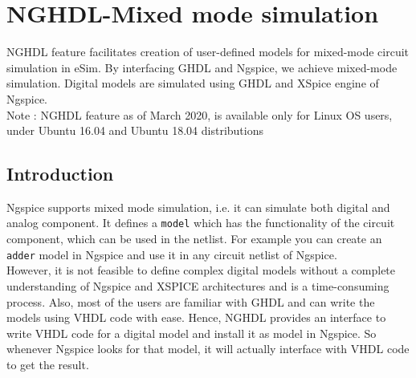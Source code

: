 \chapter{NGHDL-Mixed mode simulation}
\label{chap9}
\thispagestyle{empty}


NGHDL feature facilitates creation of user-defined models for mixed-mode circuit simulation in eSim. By interfacing GHDL and Ngspice, we achieve mixed-mode simulation. Digital models are simulated using GHDL and XSpice engine of Ngspice. \\

Note : NGHDL feature as of March 2020, is available only for Linux OS users, under Ubuntu 16.04 and Ubuntu 18.04 distributions

\section{Introduction}

Ngspice supports mixed mode simulation, i.e. it can simulate both digital and analog component. It defines a \texttt{model} which has the functionality of the circuit component, which can be used in the netlist.
For example you can create an \texttt{adder} model in Ngspice and use it in any circuit netlist of Ngspice. \\

However, it is not feasible to define complex digital models without a complete understanding of Ngspice and XSPICE architectures and is a time-consuming process. Also, most of the users are familiar with GHDL and can write the models using VHDL code with ease.
Hence, NGHDL provides an  interface to write VHDL code for a digital model and install it as model in Ngspice. So whenever Ngspice looks for that model, it will actually interface with VHDL code to get the result. \\

